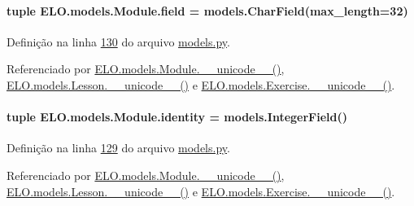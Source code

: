 \paragraph[{field}]{\setlength{\rightskip}{0pt plus 5cm}tuple E\+L\+O.\+models.\+Module.\+field = models.\+Char\+Field(max\+\_\+length=32)\hspace{0.3cm}{\ttfamily [static]}}\label{classELO_1_1models_1_1Module_ad05ba106a7012cd72877fe21e8639e2d}


Definição na linha \hyperlink{ELO_2models_8py_source_l00130}{130} do arquivo \hyperlink{ELO_2models_8py_source}{models.\+py}.



Referenciado por \hyperlink{classELO_1_1models_1_1Module_a8fc9fadf09fa7b3bbcfea69ebe25d278}{E\+L\+O.\+models.\+Module.\+\_\+\+\_\+unicode\+\_\+\+\_\+()}, \hyperlink{classELO_1_1models_1_1Lesson_a53e265de97c6b73f262f62a80f9ca994}{E\+L\+O.\+models.\+Lesson.\+\_\+\+\_\+unicode\+\_\+\+\_\+()} e \hyperlink{classELO_1_1models_1_1Exercise_a23f81c66e4d6bc5a4582d74d191f5117}{E\+L\+O.\+models.\+Exercise.\+\_\+\+\_\+unicode\+\_\+\+\_\+()}.

\hypertarget{classELO_1_1models_1_1Module_abbf09409159a27a42ea6cb33fcc7fde7}{}
\paragraph[{identity}]{\setlength{\rightskip}{0pt plus 5cm}tuple E\+L\+O.\+models.\+Module.\+identity = models.\+Integer\+Field()\hspace{0.3cm}{\ttfamily [static]}}\label{classELO_1_1models_1_1Module_abbf09409159a27a42ea6cb33fcc7fde7}


Definição na linha \hyperlink{ELO_2models_8py_source_l00129}{129} do arquivo \hyperlink{ELO_2models_8py_source}{models.\+py}.



Referenciado por \hyperlink{classELO_1_1models_1_1Module_a8fc9fadf09fa7b3bbcfea69ebe25d278}{E\+L\+O.\+models.\+Module.\+\_\+\+\_\+unicode\+\_\+\+\_\+()}, \hyperlink{classELO_1_1models_1_1Lesson_a53e265de97c6b73f262f62a80f9ca994}{E\+L\+O.\+models.\+Lesson.\+\_\+\+\_\+unicode\+\_\+\+\_\+()} e \hyperlink{classELO_1_1models_1_1Exercise_a23f81c66e4d6bc5a4582d74d191f5117}{E\+L\+O.\+models.\+Exercise.\+\_\+\+\_\+unicode\+\_\+\+\_\+()}.

\hypertarget{classELO_1_1models_1_1Module_a5b31cea93dea5474f3ff974cd745e39f}{}
